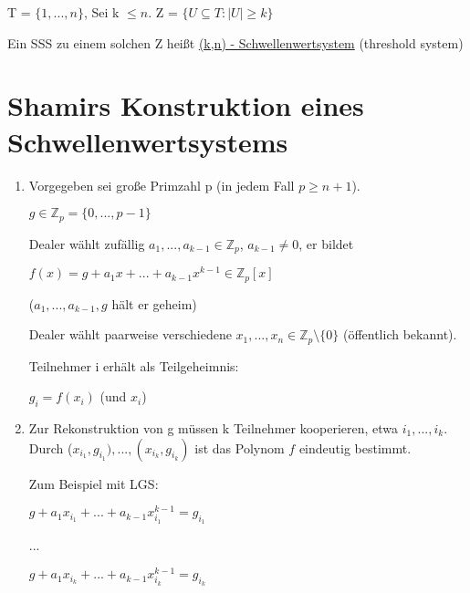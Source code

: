   T = $\{1,...,n\}$, Sei k $\le n$. Z = $\{ U \subseteq T : |U| \ge k\}$

  \par \medskip

  Ein SSS zu einem solchen Z heißt \underline{(k,n) - Schwellenwertsystem} (threshold system)


  \section{Shamirs Konstruktion eines Schwellenwertsystems}

  \begin{enumerate}[label=(\alph*)]
    \item Vorgegeben sei große Primzahl p (in jedem Fall $p \ge n+1$).

    $g \in \mathbb{Z}_p = \{0,..., p-1\}$

    Dealer wählt zufällig $a_1, ..., a_{k-1} \in \mathbb{Z}_p$, $a_{k-1} \neq 0$, er bildet

    \begin{center}
      $f(x) = g + a_1x + ... + a_{k-1}x^{k-1} \in \mathbb{Z}_p[x]$
    \end{center}

    ($a_1, ..., a_{k-1}, g$ hält er geheim)

    \par \medskip

    \par \medskip

    Dealer wählt paarweise verschiedene $x_1, ..., x_n \in \mathbb{Z}_p \setminus \{0\}$ (öffentlich bekannt).

    Teilnehmer i erhält als Teilgeheimnis:

    \begin{center}
      $g_i = f(x_i)$ (und $x_i$)
    \end{center}

    \item Zur Rekonstruktion von g müssen k Teilnehmer kooperieren, etwa $i_1, ..., i_k$. Durch ($x_{i_1}, g_{i_1}), ..., (x_{i_k}, g_{i_k})$ ist das Polynom $f$ eindeutig bestimmt.

    Zum Beispiel mit LGS:

    \begin{center}
      $g + a_1x_{i_1} + ... + a_{k-1}x_{i_1}^{k-1} = g_{i_1}$

      ...

      $g + a_1x_{i_k} + ... + a_{k-1}x_{i_k}^{k-1} = g_{i_k}$
    \end{center}


\end{enumerate}
